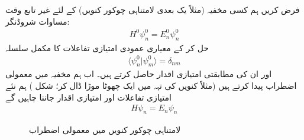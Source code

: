
فرض کریں ہم کسی مخفیہ (مثلاً   یک  بعدی لامتناہی چوکور کنویں) کے لئے غیر تابع وقت مساوات شروڈنگر:
\begin{align}\label{مساوات_اضطراب_پہلی}
H^0\psi_n^0=E_n^0\psi_n^0
\end{align}
حل کر کے معیاری عمودی امتیازی تفاعلات  کا مکمل سلسلہ
\begin{align}
\langle \psi_n^0 | \psi_m^0 \rangle = \delta_{nm}
\end{align}
اور ان کی مطابقتی امتیازی اقدار  حاصل کرتے ہیں۔ اب ہم مخفیہ میں معمولی اضطراب پیدا کرتے ہیں (مثلاً کنویں کی تہہ میں ایک چھوٹا موڑا ڈال کر؛  شکل ) ہم  نئے  امتیازی تفاعلات اور امتیازی اقدار جاننا چاہیں گے
\begin{align}\label{مساوات_اضطراب_بنیادی}
H\psi_n = E_n\psi_n
\end{align}
%
\begin{figure}
\centering
{}
\caption{لامتناہی چوکور کنویں میں معمولی اضطراب}
\label{شکل_غیر_تابع_اضطراب_چکور_معمولی}
\end{figure}

